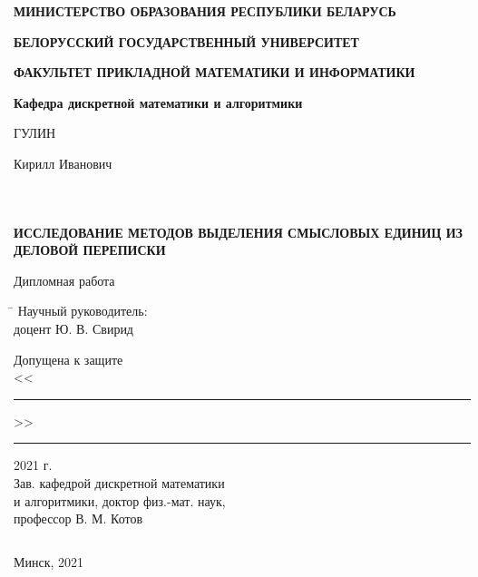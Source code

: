 \begin{titlepage}
\begin{center}

\textbf{МИНИСТЕРСТВО ОБРАЗОВАНИЯ РЕСПУБЛИКИ БЕЛАРУСЬ}
\vspace{1.5 ex}

\textbf{БЕЛОРУССКИЙ ГОСУДАРСТВЕННЫЙ УНИВЕРСИТЕТ}
\vspace{1.5 ex}

\textbf{ФАКУЛЬТЕТ ПРИКЛАДНОЙ МАТЕМАТИКИ И ИНФОРМАТИКИ}
\vspace{1.5 ex}

\textbf{Кафедра дискретной математики и алгоритмики}
\vspace{7 ex}

\noindent
ГУЛИН

\large
Кирилл Иванович
\vspace{5 ex}

$ $

$ $

$ $


\textbf{ИССЛЕДОВАНИЕ МЕТОДОВ ВЫДЕЛЕНИЯ СМЫСЛОВЫХ ЕДИНИЦ ИЗ ДЕЛОВОЙ ПЕРЕПИСКИ}

\vspace{7 ex}
\large
Дипломная работа
\vspace{5 ex}

\begin{tabbing}
\hspace*{107mm}\=\hspace*{7cm}
\kill 
 \> Научный руководитель: \\
 \>  доцент Ю. В. Свирид \\ \vspace{5 ex}

Допущена к защите \\
<<\rule {30pt} {0.5 pt}>>\rule {100pt} {0.5 pt} 2021 г. \> \\
Зав. кафедрой дискретной математики \> \\
и алгоритмики, доктор физ.-мат. наук,\> \\
профессор В. М. Котов
\end{tabbing}

\vfill

$ $

Минск, 2021

\end{center}

\end{titlepage}